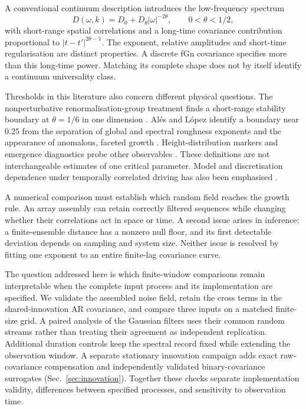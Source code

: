 A conventional continuum description introduces the low-frequency spectrum
\cite{Medina1989,SquizzatoCanet2019}
\begin{equation}
 D(\omega,k)=D_0+D_\theta|\omega|^{-2\theta},\qquad0<\theta<1/2,
 \label{eq:noise}
\end{equation}
with short-range spatial correlations and a long-time covariance contribution
proportional to $|t-t'|^{2\theta-1}$. The exponent, relative amplitudes and
short-time regularisation are distinct properties. A discrete fGn covariance
specifies more than this long-time power. Matching its complete shape does not
by itself identify a continuum universality class.

Thresholds in this literature also concern different physical questions.
The nonperturbative renormalisation-group treatment finds a short-range
stability boundary at $\theta=1/6$ in one dimension \cite{SquizzatoCanet2019}.
Al\'es and L\'opez identify a boundary near $0.25$ from the separation of
global and spectral roughness exponents and the appearance of anomalous,
faceted growth \cite{AlesLopez2019}. Height-distribution markers and emergence
diagnostics probe other observables \cite{JiangXia2026,WangXia2025}.
These definitions are not interchangeable estimates of one critical parameter.
Model and discretisation dependence under temporally correlated driving has
also been emphasised \cite{RodriguezFernandez2024}.

A numerical comparison must establish which random field reaches the growth
rule. An array assembly can retain correctly filtered sequences while changing
whether their correlations act in space or time. A second issue arises in
inference: a finite-ensemble distance has a nonzero null floor, and its first
detectable deviation depends on sampling and system size. Neither issue is
resolved by fitting one exponent to an entire finite-lag covariance curve.

The question addressed here is which finite-window comparisons remain
interpretable when the complete input process and its implementation are
specified. We validate the assembled noise field, retain the cross terms in
the shared-innovation AR covariance, and compare three inputs on a matched
finite-size grid. A paired analysis of the Gaussian filters uses their common
random streams rather than treating their agreement as independent replication.
Additional duration controls keep the spectral record fixed while extending
the observation window. A separate stationary innovation campaign adds exact
raw-covariance compensation and independently validated binary-covariance
surrogates (Sec.~\ref{sec:innovation}).
Together these checks separate implementation validity,
differences between specified processes, and sensitivity to observation time.

